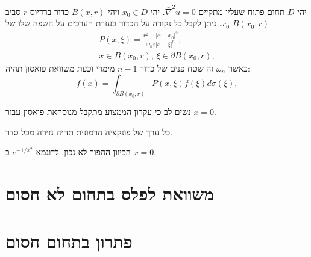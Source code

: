 \documentclass{tstextbook}
\begin{document}
\begin{proposition}
יהי \(D\) תחום פתוח שעליו מתקיים \(\bar{\nabla}^2u=0\). יהי \(x_{0} \in D\) ויהי \(B(x,r)\) כדור ברדיוס \(r\) סביב \(x_{0}\). ניתן לקבל כל נקודה על הכדור בעזרת הערכים על השפה שלו של \(B(x_{0},r)\)$$\begin{array}{c}{{P(x,\xi)=\frac{r^{2}-\left|x-x_{0}\right|^{2}}{\omega_{n}r|x-\xi|^{n}},}}\\ {{x\in B(x_{0},r),\,\xi\in\partial B(x_{0},r),}}\end{array}$$
כאשר \(\omega_{n}\) זה שטח פנים של כדור \(n- 1\) מימדי וכעת משוואת פואסון תהיה:
$$f(x)=\int_{\partial B(x_{0},r)}P(x,\xi)f(\xi)d\sigma(\xi),$$

\end{proposition}
\begin{remark}
נשים לב כי עקרון הממצוע מתקבל מנוסחאת פואסון עבור \(x=0\).

\end{remark}
\begin{proposition}
כל ערך של פונקציה הרמונית תהיה גזירה מכל סדר.

\end{proposition}
\begin{remark}
הכיוון ההפוך לא נכון. לדוגמא \(e^{ -1/x^{2} }\) ב-\(x=0\).

\end{remark}
\section{משוואת לפלס בתחום לא חסום}

\section{פתרון בתחום חסום}
\end{document}
